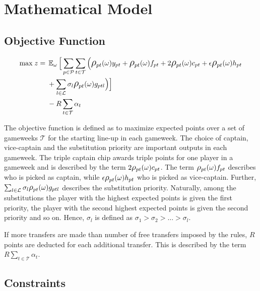 \section{Mathematical Model} \label{mathematical_model}

\subsection{Objective Function}

\begin{equation}
\smaller
\begin{aligned}
\text{max} \; z ={} & \EX_{\omega} \Big\lbrack\sum\limits_{p \in \mathcal{P}} \sum\limits_{t \in \mathcal{T}} \Big( \mathlarger{\rho}_{pt}(\omega)y_{pt} + \mathlarger{\rho}_{pt}(\omega)f_{pt} + 2 \mathlarger{\rho}_{pt}(\omega)c_{pt} + \epsilon  \mathlarger{\rho}_{pt}(\omega)h_{pt} \\ 
& + \sum_{l \in \mathcal{L}}\sigma_{l} \mathlarger{\rho}_{pt}(\omega)g_{ptl} \Big)  \Big\rbrack \\ 
& - R\sum_{t \in \mathcal{T}}\alpha_{t}
\end{aligned}
\end{equation}

\newpar
The objective function is defined as to maximize expected points over a set of gameweeks $\mathcal{T}$ for the starting line-up in each gameweek. The choice of captain, vice-captain and the substitution priority are important outputs in each gameweek. The triple captain chip awards triple points for one player in a gameweek and is described by the term $2 \mathlarger{\rho}_{pt}(\omega)c_{pt}$. The term $\mathlarger{\rho}_{pt}(\omega)f_{pt}$ describes who is picked as captain, while $\epsilon \mathlarger{\rho}_{pt}(\omega)h_{pt}$ who is picked as vice-captain. Further, $\sum_{l \in \mathcal{L}}\sigma_{l} \mathlarger{\rho}_{pt}(\omega)g_{ptl}$ describes the substitution priority. Naturally, among the substitutions the player with the highest expected points is given the first priority, the player with the second highest expected points is given the second priority and so on. Hence, $\sigma_{l}$ is defined as $\sigma_{1} > \sigma_{2} > \ldots > \sigma_{l}$. 

\newpar

If more transfers are made than number of free transfers  imposed by the rules, $R$ points are deducted for each additional transfer. This is described by the term $R\sum_{t \in \mathcal{T}}\alpha_{t}$. 


\subsection{Constraints}

